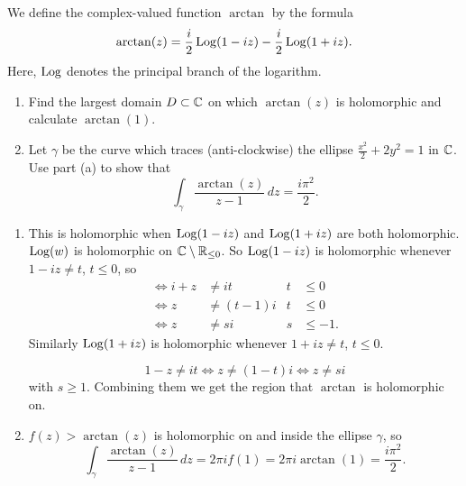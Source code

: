 \documentclass[10pt, a4paper]{article}
\begin{document}
\begin{problem}
    We define the complex-valued function $\arctan$ by the formula
    \[
    \arctan(z) = \frac{i}{2}\operatorname{Log}(1 - iz) - \frac{i}{2}\operatorname{Log}(1 + iz).
    \]
    Here,
    $\operatorname{Log}$ denotes the principal branch of the logarithm.

    \begin{enumerate}[label = (\alph*)]
        \item Find the largest domain $D \subset \mathbb{C}$ on which $\arctan(z)$ is holomorphic and calculate $\arctan(1)$.

        \item Let $\gamma$ be the curve which traces
        (anti-clockwise)
        the ellipse $\frac{x ^ 2}{2} + 2y ^ 2 = 1$ in $\mathbb{C}$.
        Use part (a) to show that
        \[
        \int_{\gamma}\frac{\arctan(z)}{z - 1}\,dz = \frac{i\pi ^ 2}{2}.
        \]
    \end{enumerate}

    \begin{solution}\phantom{}
        \begin{enumerate}[label = (\alph*)]
            \item This is holomorphic when $\operatorname{Log}(1 - iz)$ and $\operatorname{Log}(1 + iz)$ are both holomorphic.
            $\operatorname{Log}(w)$ is holomorphic on $\mathbb{C} \setminus \mathbb{R}_{\leq 0}$.
            So $\operatorname{Log}(1 - iz)$ is holomorphic whenever $1 - iz \neq t$,
            $t \leq 0$,
            so
            \begin{align*}
                \iff i + z &\neq it& t &\leq 0 \\
                \iff z &\neq (t - 1)i& t &\leq 0 \\
                \iff z &\neq si & s &\leq -1.
            \end{align*}
            Similarly $\operatorname{Log}(1 + iz)$ is holomorphic whenever $1 + iz \neq t$,
            $t \leq 0$.

            \[
            1 - z \neq it \iff z \neq (1 - t)i \iff z \neq si
            \]
            with $s \geq 1$.
            Combining them we get the region that $\arctan$ is holomorphic on.

            \item $f(z) > \arctan(z)$ is holomorphic on and inside the ellipse $\gamma$,
            so
            \[
            \int_{\gamma}\frac{\arctan(z)}{z - 1}\,dz = 2\pi if(1) = 2\pi i\arctan(1) = \frac{i\pi ^ 2}{2}.
            \]
        \end{enumerate}
    \end{solution}
\end{problem}
\end{document}
